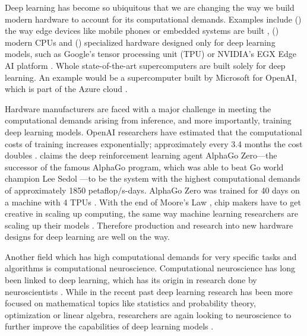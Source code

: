 \documentclass[]{article}
\begin{document}
Deep learning has become so ubiquitous that we are changing the
way we build modern hardware to account for its computational demands.
Examples include () the way edge devices like mobile
phones or embedded systems are built \citep{deng_2019},
() modern CPUs \citep{perez_2017} and ()
specialized hardware designed only for deep learning models, such
as Google's tensor processing unit (TPU) \citep{jouppi_et_al_2017} or
NVIDIA's EGX Edge AI platform \citep{boitano_2020}.
Whole state-of-the-art supercomputers are built solely for deep
learning.
An example would be a supercomputer built by Microsoft for OpenAI,
which is part of the Azure cloud \citep{langston_2020}.

Hardware manufacturers are faced with a major challenge in meeting the
computational demands arising from inference, and more importantly,
training deep learning models.
OpenAI researchers have estimated that the computational costs of
training increases exponentially; approximately every 3.4 months the
cost doubles \citep{amodei_et_al_2019}.
\citet{amodei_et_al_2019} claims the deep reinforcement learning agent
AlphaGo Zero---the successor of the famous AlphaGo program, which
was able to beat Go world champion Lee Sedol
\citep{silver_et_al_2017}---to be the system  with the highest
computational demands of approximately 1850 petaflop/s-days.
AlphaGo Zero was trained for 40 days on a machine with 4 TPUs
\citep{silver_et_al_2017}.
With the end of Moore's Law \citep{loeffler_2018}, chip makers have to
get creative in scaling up computing, the same way machine learning
researchers are scaling up their models \citep{simonite_2016}.
Therefore production and research into new hardware designs for deep
learning are well on the way.

Another field which has high computational demands for very specific
tasks and algorithms is computational neuroscience.
Computational neuroscience has long been linked to deep learning,
which has its origin in research done by neuroscientists
\citep{goodfellow_et_al_2016, mcculloch_et_al_1943}.
While in the recent past deep learning research has been more focused
on mathematical topics like statistics and probability theory,
optimization or linear algebra, researchers are again looking to
neuroscience to further improve the capabilities of deep
learning models \citep{marblestone_et_al_2016}.
\end{document}
